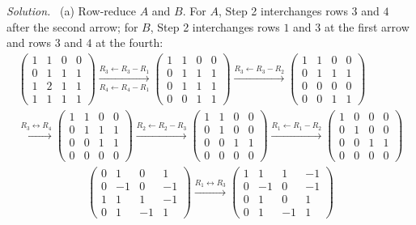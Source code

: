 \documentclass[12pt]{article}
\theoremstyle{definition}
\newenvironment{solution}{\par\noindent\textit{Solution.}\ }{\par\smallskip}
\begin{document}
\begin{solution}
(a) Row-reduce \(A\) and \(B\). For \(A\), Step 2 interchanges rows \(3\) and \(4\) after the second arrow; for
\(B\), Step 2 interchanges rows \(1\) and \(3\) at the first arrow and rows \(3\) and \(4\) at the fourth:
\[
\begin{gathered}
\begin{pmatrix}1&1&0&0\\0&1&1&1\\1&2&1&1\\1&1&1&1\end{pmatrix}
\xrightarrow[R_4\leftarrow R_4-R_1]{R_3\leftarrow R_3-R_1}
\begin{pmatrix}1&1&0&0\\0&1&1&1\\0&1&1&1\\0&0&1&1\end{pmatrix}
\xrightarrow{R_3\leftarrow R_3-R_2}
\begin{pmatrix}1&1&0&0\\0&1&1&1\\0&0&0&0\\0&0&1&1\end{pmatrix}
\\
\xrightarrow{R_3\leftrightarrow R_4}
\begin{pmatrix}1&1&0&0\\0&1&1&1\\0&0&1&1\\0&0&0&0\end{pmatrix}
\xrightarrow{R_2\leftarrow R_2-R_3}
\begin{pmatrix}1&1&0&0\\0&1&0&0\\0&0&1&1\\0&0&0&0\end{pmatrix}
\xrightarrow{R_1\leftarrow R_1-R_2}
\begin{pmatrix}1&0&0&0\\0&1&0&0\\0&0&1&1\\0&0&0&0\end{pmatrix}
\end{gathered}
\]
\[
\begin{gathered}
\begin{pmatrix}0&1&0&1\\0&-1&0&-1\\1&1&1&-1\\0&1&-1&1\end{pmatrix}
\xrightarrow{R_1\leftrightarrow R_3}
\begin{pmatrix}1&1&1&-1\\0&-1&0&-1\\0&1&0&1\\0&1&-1&1\end{pmatrix}

\end{gathered}\]
\end{solution}
\end{document}
